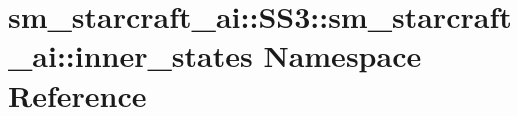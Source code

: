 \hypertarget{namespacesm__starcraft__ai_1_1SS3_1_1sm__starcraft__ai_1_1inner__states}{}\section{sm\+\_\+starcraft\+\_\+ai\+:\+:S\+S3\+:\+:sm\+\_\+starcraft\+\_\+ai\+:\+:inner\+\_\+states Namespace Reference}
\label{namespacesm__starcraft__ai_1_1SS3_1_1sm__starcraft__ai_1_1inner__states}
